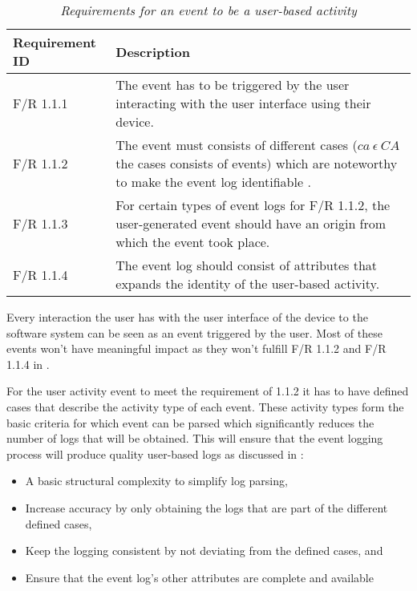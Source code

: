 \begin{table}[!htb]
	\centering
	\small
	\caption[Requirements for an event to be a user-based activity]
	{\textit{Requirements for an event to be a user-based activity}}
	\label{tbl:ch2_requirementsForUserActivtyEvent}
	\begin{tabularx}{\textwidth}{|l|X|}
		\hline \textbf{Requirement ID} & \textbf{Description}\\
		\hline F/R 1.1.1 & The event has to be triggered by the user interacting with the user interface using their device. \\
		\hline F/R 1.1.2 & The event must consists of different cases ($ca~ \epsilon~CA$ the cases consists of events) which are noteworthy to make the event log identifiable \cite{Slaninova2014}. \\
		\hline F/R 1.1.3 & For certain types of event logs for F/R 1.1.2, the user-generated event should have an origin from which the event took place. \\
		\hline F/R 1.1.4 & The event log should consist of attributes that expands the identity of the user-based activity. \\
		\hline
	\end{tabularx}
\end{table}

Every interaction the user has with the user interface of the device to the software system can be seen as an event triggered by the user. Most of these events won't have meaningful impact as they won't fulfill F/R 1.1.2 and F/R 1.1.4 in .\par For the user activity event to meet the requirement of 1.1.2 it has to have defined cases that describe the activity type of each event. These activity types form the basic criteria for which event can be parsed which significantly reduces the number of logs that will be obtained. This will ensure that the event logging process will produce quality user-based logs as discussed in :

\begin{itemize}
	\item A basic structural complexity to simplify log parsing,
	\item Increase accuracy by only obtaining the logs that are part of the different defined cases,
	\item Keep the logging consistent by not deviating from the defined cases, and
	\item Ensure that the event log's other attributes are complete and available
\end{itemize}

